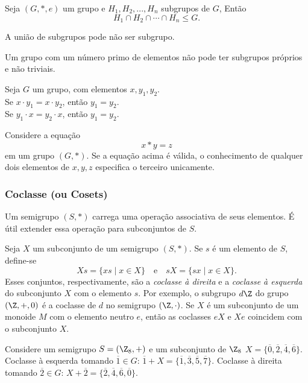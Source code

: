          \begin{theorem}
            Seja $(G, *, e)$ um grupo e $H_{1},H_{2}, ..., H_{n}$ subgrupos de $G$, Então $$ H_{1} \cap H_{2} \cap \cdots \cap H_{n} \leq G.$$
         \end{theorem}
         \begin{stat}
            A união de subgrupos pode não ser subgrupo.
         \end{stat}
         \begin{stat}
            Um grupo com um número primo de elementos não pode ter subgrupos próprios e não triviais.
         \end{stat}
         \begin{stat}
            Seja $G$ um grupo, com elementos $x,y_{1},y_{2}$.\\
            Se $x\cdot y_{1} = x\cdot y_{2}$, então $y_{1} = y_{2}$.\\
            Se $y_{1}\cdot x = y_{2}\cdot x$, então $y_{1} = y_{2}$.
         \end{stat}
            \begin{corollary}\label{UnicSolu}
            Considere a equação $$x * y = z$$
            em um grupo $(G,*)$. Se a equação acima é válida, o conhecimento de qualquer dois elementos de $x,y,z$ especifica o terceiro unicamente.
         \end{corollary}

      \subsubsection{Coclasse (ou Cosets)}
         Um semigrupo $(S,*)$ carrega uma operação associativa de seus elementos. É útil extender essa operação para subconjuntos de $S$.

         Seja $X$ um subconjunto de um semigrupo $(S,*)$. Se $s$ é um elemento de $S$, define-se $$ Xs = \{xs \mid x \in X\}\quad \textrm{e}\quad sX = \{sx \mid x \in X\}.$$
         Esses conjuntos, respectivamente, são a \emph{coclasse à direita} e a \emph{coclasse à esquerda} do subconjunto $X$ com o elemento $s$. Por exemplo, o subgrupo $d\Z$ do grupo $(\Z,+,0)$ é a coclasse de $d$ no semigrupo $(\Z,\cdot)$.
         Se $X$ é um subconjunto de um monoide $M$ com o elemento neutro $e$, então as coclasses $eX$ e $Xe$ coincidem com o subconjunto $X$.

         \begin{exmp}
            Considere um semigrupo $S = (\Z_{8},+)$ e um subconjunto de $\Z_{8}$ $X=\{\overline{0},\overline{2},\overline{4},\overline{6}\}$.
            Coclasse à esquerda tomando $\overline{1} \in G$: $\overline{1} + X = \{\overline{1},\overline{3},\overline{5},\overline{7}\}$.
            Coclasse à direita tomando $\overline{2} \in G$: $X + \overline{2} = \{\overline{2},\overline{4},\overline{6},\overline{0}\}$.
         \end{exmp}

